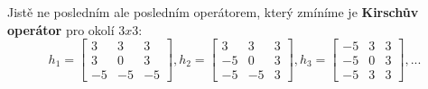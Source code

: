 \documentclass{thesis}%
\begin{document}
Jistě ne posledním ale posledním operátorem, který zmíníme je \textbf{Kirschův operátor} pro okolí $3x3$:
$$
h_1 = \left[
\begin{matrix}
3&3&3\\
3&0&3\\
-5&-5&-5
\end{matrix}
\right],
h_2 = \left[
\begin{matrix}
3&3&3\\
-5&0&3\\
-5&-5&3\end{matrix}
\right],
h_3 = \left[
\begin{matrix}
-5&3&3\\
-5&0&3\\
-5&3&3
\end{matrix}
\right],...
$$
 \begin{figure}[htp!]
  \centering
  

\end{figure}
\end{document}
